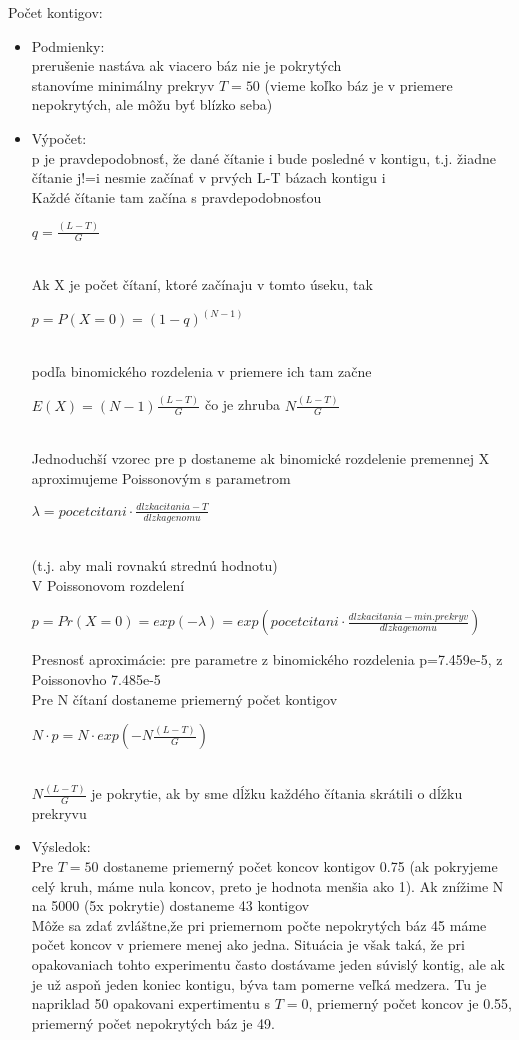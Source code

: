 				Počet kontigov: 
			\begin{itemize}
				\item Podmienky:\\
				prerušenie nastáva ak viacero báz nie je pokrytých\\
				stanovíme minimálny prekryv $T=50$ (vieme koľko báz je v priemere nepokrytých, ale môžu byť blízko seba)\\
				\item Výpočet:\\
				p je pravdepodobnosť, že dané čítanie i bude posledné v kontigu, t.j. žiadne čítanie j!=i nesmie začínať v prvých L-T bázach kontigu i\\
				Každé čítanie tam začína s pravdepodobnosťou \\
				\centerline{$q= \frac{(L-T)}{G}$}\\
				Ak X je počet čítaní, ktoré začínaju v tomto úseku, tak \\
				\centerline{$p = P(X=0) = (1-q)^{(N-1)}$} \\
				podľa binomického rozdelenia v priemere ich tam začne \\
				\centerline{$E(X) = (N-1)\frac{(L-T)}{G}$ čo je zhruba $N\frac{(L-T)}{G}$}\\
				Jednoduchší vzorec pre p dostaneme ak binomické rozdelenie premennej X aproximujeme Poissonovým s parametrom  \\
				\centerline{$\lambda = pocet citani \cdot \frac{dlzka citania - T}{dlzka genomu}$} \\
				(t.j. aby mali rovnakú strednú hodnotu)\\

				V Poissonovom rozdelení \\
				\centerline{$p = Pr(X=0) = exp( -\lambda )= exp(pocet citani \cdot \frac{dlzka citania - min. prekryv}{dlzka genomu})$\\}
				
				Presnosť aproximácie: pre parametre  z binomického rozdelenia p=7.459e-5, z Poissonovho 7.485e-5\\
				Pre N čítaní dostaneme priemerný počet kontigov 
				\\
				\centerline{$N \cdot p = N \cdot exp(-N \frac{(L-T)}{G})$}\\
				$N \frac{(L-T)}{G}$ je pokrytie, ak by sme dĺžku každého čítania skrátili o dĺžku prekryvu\\
				\item Výsledok: \\
				Pre $T=50$ dostaneme priemerný počet koncov kontigov 0.75 (ak pokryjeme celý kruh, máme nula koncov, preto je hodnota menšia ako 1). Ak znížime N na 5000 (5x pokrytie) dostaneme 43 kontigov\\

				Môže sa zdať zvláštne,že pri priemernom počte nepokrytých báz 45 máme počet koncov v priemere menej ako jedna. Situácia je však taká, že pri opakovaniach tohto experimentu často dostávame jeden súvislý kontig, ale ak je už aspoň jeden koniec kontigu, býva tam pomerne veľká medzera. Tu je napriklad 50 opakovani expertimentu s $T=0$, priemerný počet koncov je 0.55, priemerný počet nepokrytých báz je 49.
				\end{itemize}

